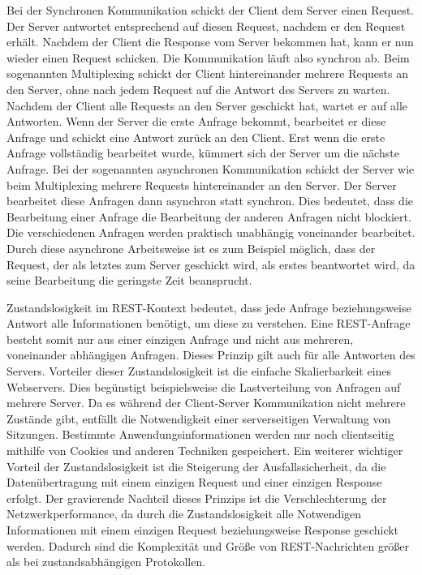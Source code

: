 Bei der Synchronen Kommunikation schickt der Client dem Server einen Request. Der Server antwortet entsprechend auf diesen Request, nachdem er den Request erhält. Nachdem der Client die Response vom Server bekommen hat, kann er nun wieder einen Request schicken. Die Kommunikation läuft also synchron ab. 
Beim sogenannten Multiplexing schickt der Client hintereinander mehrere Requests an den Server, ohne nach jedem Request auf die Antwort des Servers zu warten. Nachdem der Client alle Requests an den Server geschickt hat, wartet er auf alle Antworten. Wenn der Server die erste Anfrage bekommt, bearbeitet er diese Anfrage und schickt eine Antwort zurück an den Client. Erst wenn die erste Anfrage vollständig bearbeitet wurde, kümmert sich der Server um die nächste Anfrage. 
Bei der sogenannten asynchronen Kommunikation schickt der Server wie beim Multiplexing mehrere Requests hintereinander an den Server. Der Server bearbeitet diese Anfragen dann asynchron statt synchron. Dies bedeutet, dass die Bearbeitung einer Anfrage die Bearbeitung der anderen Anfragen nicht blockiert. Die verschiedenen Anfragen werden praktisch unabhängig voneinander bearbeitet. Durch diese asynchrone Arbeitsweise ist es zum Beispiel möglich, dass der Request, der als letztes zum Server geschickt wird, als erstes beantwortet wird, da seine Bearbeitung die geringste Zeit beansprucht. \cite{ClientServer}


Zustandslosigkeit im REST-Kontext bedeutet, dass jede Anfrage beziehungsweise Antwort alle Informationen benötigt, um diese zu verstehen. Eine REST-Anfrage besteht somit nur aus einer einzigen Anfrage und nicht aus mehreren, voneinander abhängigen Anfragen. Dieses Prinzip gilt auch für alle Antworten des Servers. Vorteiler dieser Zustandslosigkeit ist die einfache Skalierbarkeit eines Webservers. Dies begünstigt beispielsweise die Lastverteilung von Anfragen auf mehrere Server. Da es während der Client-Server Kommunikation nicht mehrere Zustände gibt, entfällt die Notwendigkeit einer serverseitigen Verwaltung von Sitzungen. Bestimmte Anwendungsinformationen werden nur noch clientseitig mithilfe von Cookies und anderen Techniken gespeichert. Ein weiterer wichtiger Vorteil der Zustandslosigkeit ist die Steigerung der Ausfallssicherheit, da die Datenübertragung mit einem einzigen Request und einer einzigen Response erfolgt. Der gravierende Nachteil dieses Prinzips ist die Verschlechterung der Netzwerkperformance, da durch die Zustandslosigkeit alle Notwendigen Informationen mit einem einzigen Request beziehungsweise Response geschickt werden. Dadurch sind die Komplexität und Größe von REST-Nachrichten größer als bei zustandsabhängigen Protokollen. \cite{WikiREST}

